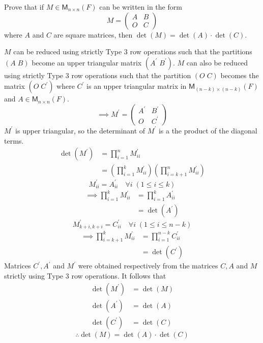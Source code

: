 Prove that if $M\in \mathsf{M}_{n\times n}(F)$ can be written in the
form
\[
M = \begin{pmatrix} A & B\\ O & C
\end{pmatrix}
\]
where $A$ and $C$ are square matrices, then $\det{(M)} =
\det{(A)}\cdot\det{(C)}$.

$M$ can be reduced using strictly Type 3 row operations such that the
partitions $(A\; B)$ become an upper triangular matrix $(A^\prime\; 
B^\prime)$. $M$ can also be reduced using strictly Type 3 row
operations such that the partition $(O\; C)$ becomes the matrix $(O\; 
C^\prime)$ where $C^\prime$ is an upper triangular matrix in
$\mathsf{M}_{(n-k)\times(n-k)}(F)$ and $A \in \mathsf{M}_{n\times
  n}(F)$.
\begin{equation}
\implies M^\prime = \begin{pmatrix}A^\prime & B^\prime \\ O & C^\prime
\end{pmatrix}
\end{equation}
$M^\prime$ is upper triangular, so the determinant of $M^\prime$ is a
the product of the diagonal terms.
\begin{align}
\det{(M^\prime)} &= \prod\limits^{n}_{i=1}M^\prime_{ii}\\
&= \left(\prod\limits^{k}_{i=1}M^\prime_{ii}\right)\left(\prod\limits^{n}_{i=k+1}M^\prime_{ii}\right)
\end{align}
\begin{equation}
M^\prime_{ii} = A^\prime_{ii} \quad \forall i \; (1\leq i\leq k)
\end{equation}
\begin{align}
\implies \prod\limits_{i=1}^k M^\prime_{ii} &= \prod\limits_{i=1}^k
A^\prime_{ii}\\
&= \det{(A^\prime)}
\end{align}
\begin{equation}
M^\prime_{k+i,k+i} = C^\prime_{ii} \quad \forall i \; (1\leq i\leq n-k)
\end{equation}
\begin{align}
\implies \prod\limits_{i=k+1}^k M^\prime_{ii} &= \prod\limits_{i=1}^{n-k}
C^\prime_{ii}\\
&= \det{(C^\prime)}
\end{align}
Matrices $C^\prime,A^\prime$ and $M^\prime$ were obtained respectively
from the matrices $C,A$ and $M$ strictly using Type 3 row
operations. It follows that
\begin{align}
\det{(M^\prime)} &= \det{(M)}\\
\det{(A^\prime)} &= \det{(A)}\\
\det{(C^\prime)} &= \det{(C)}
\end{align}
\begin{equation}
\therefore \det{(M)} = \det{(A)} \cdot \det{(C)}
\end{equation}
